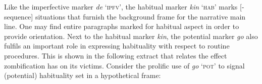 \ea%
    \label{ex:key:461}
\z
\z

Like the imperfective marker \textit{de} ‘\textsc{ipfv}’, the habitual marker \textit{kin} ‘\textsc{hab}’ marks [-sequence] situations that furnish the background frame for the narrative main line. One may find entire paragraphs marked for habitual aspect in order to provide orientation. Next to the habitual marker \textit{kin}, the potential marker \textit{go} also fulfils an important role in expressing habituality with respect to routine procedures. This is shown in the following extract that relates the effect zombification has on its victims. Consider the prolific use of \textit{go} ‘\textsc{pot}’ to signal (potential) habituality set in a hypothetical frame: 


